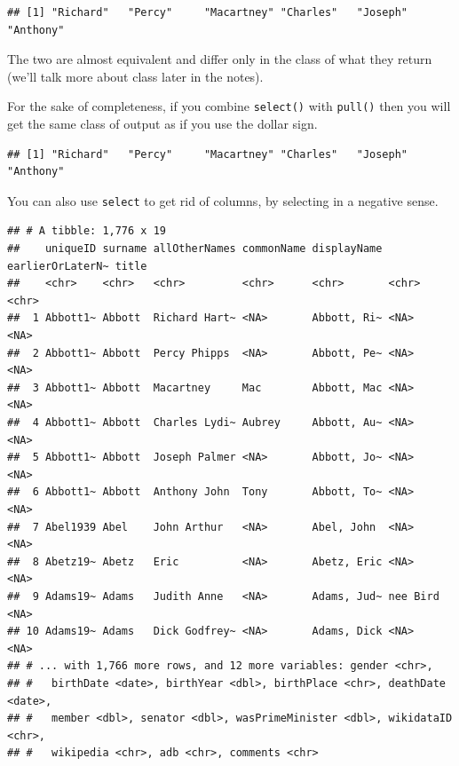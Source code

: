 \documentclass[
]{book}
\newenvironment{Shaded}{\begin{snugshade}}{\end{snugshade}}
\newcommand{\KeywordTok}[1]{\textcolor[rgb]{0.13,0.29,0.53}{\textbf{#1}}}
\newcommand{\NormalTok}[1]{#1}
\newcommand{\OperatorTok}[1]{\textcolor[rgb]{0.81,0.36,0.00}{\textbf{#1}}}
\newcommand{\StringTok}[1]{\textcolor[rgb]{0.31,0.60,0.02}{#1}}
\begin{document}
\begin{verbatim}
## [1] "Richard"   "Percy"     "Macartney" "Charles"   "Joseph"    "Anthony"
\end{verbatim}

The two are almost equivalent and differ only in the class of what they return (we'll talk more about class later in the notes).

For the sake of completeness, if you combine \texttt{select()} with \texttt{pull()} then you will get the same class of output as if you use the dollar sign.

\begin{Shaded}
\end{Shaded}

\begin{verbatim}
## [1] "Richard"   "Percy"     "Macartney" "Charles"   "Joseph"    "Anthony"
\end{verbatim}

You can also use \texttt{select} to get rid of columns, by selecting in a negative sense.

\begin{Shaded}
\end{Shaded}

\begin{verbatim}
## # A tibble: 1,776 x 19
##    uniqueID surname allOtherNames commonName displayName earlierOrLaterN~ title
##    <chr>    <chr>   <chr>         <chr>      <chr>       <chr>            <chr>
##  1 Abbott1~ Abbott  Richard Hart~ <NA>       Abbott, Ri~ <NA>             <NA> 
##  2 Abbott1~ Abbott  Percy Phipps  <NA>       Abbott, Pe~ <NA>             <NA> 
##  3 Abbott1~ Abbott  Macartney     Mac        Abbott, Mac <NA>             <NA> 
##  4 Abbott1~ Abbott  Charles Lydi~ Aubrey     Abbott, Au~ <NA>             <NA> 
##  5 Abbott1~ Abbott  Joseph Palmer <NA>       Abbott, Jo~ <NA>             <NA> 
##  6 Abbott1~ Abbott  Anthony John  Tony       Abbott, To~ <NA>             <NA> 
##  7 Abel1939 Abel    John Arthur   <NA>       Abel, John  <NA>             <NA> 
##  8 Abetz19~ Abetz   Eric          <NA>       Abetz, Eric <NA>             <NA> 
##  9 Adams19~ Adams   Judith Anne   <NA>       Adams, Jud~ nee Bird         <NA> 
## 10 Adams19~ Adams   Dick Godfrey~ <NA>       Adams, Dick <NA>             <NA> 
## # ... with 1,766 more rows, and 12 more variables: gender <chr>,
## #   birthDate <date>, birthYear <dbl>, birthPlace <chr>, deathDate <date>,
## #   member <dbl>, senator <dbl>, wasPrimeMinister <dbl>, wikidataID <chr>,
## #   wikipedia <chr>, adb <chr>, comments <chr>
\end{verbatim}
\end{document}
